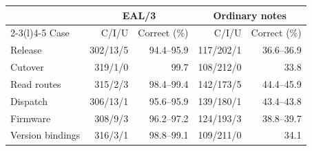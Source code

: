 \begin{tabular}{@{}l rr rr@{}}\toprule
& \multicolumn{2}{c}{EAL/3} & \multicolumn{2}{c}{Ordinary notes}\\
\cmidrule(lr){2-3}\cmidrule(l){4-5}
Case & C/I/U & Correct (\%) & C/I/U & Correct (\%)\\\midrule
Release & 302/13/5 & 94.4--95.9 & 117/202/1 & 36.6--36.9 \\
Cutover & 319/1/0 & 99.7 & 108/212/0 & 33.8 \\
Read routes & 315/2/3 & 98.4--99.4 & 142/173/5 & 44.4--45.9 \\
Dispatch & 306/13/1 & 95.6--95.9 & 139/180/1 & 43.4--43.8 \\
Firmware & 308/9/3 & 96.2--97.2 & 124/193/3 & 38.8--39.7 \\
Version bindings & 316/3/1 & 98.8--99.1 & 109/211/0 & 34.1 \\
\bottomrule\end{tabular}
